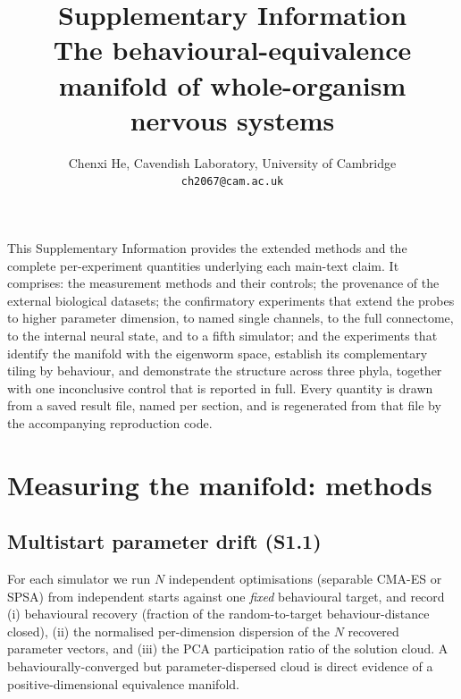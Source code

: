 \documentclass[11pt]{article}
\title{Supplementary Information \\ \large \textbf{The behavioural-equivalence manifold of whole-organism nervous systems}}
\author{Chenxi He, Cavendish Laboratory, University of Cambridge \\ \texttt{ch2067@cam.ac.uk}}
\date{}
\begin{document}
\maketitle
\tableofcontents

\noindent This Supplementary Information provides the extended methods and the complete per-experiment quantities underlying each main-text claim. It comprises: the measurement methods and their controls; the provenance of the external biological datasets; the confirmatory experiments that extend the probes to higher parameter dimension, to named single channels, to the full connectome, to the internal neural state, and to a fifth simulator; and the experiments that identify the manifold with the eigenworm space, establish its complementary tiling by behaviour, and demonstrate the structure across three phyla, together with one inconclusive control that is reported in full. Every quantity is drawn from a saved result file, named per section, and is regenerated from that file by the accompanying reproduction code.

\section{Measuring the manifold: methods}

\subsection{Multistart parameter drift (S1.1)}
For each simulator we run $N$ independent optimisations (separable CMA-ES or SPSA) from independent starts against one \emph{fixed} behavioural target, and record (i) behavioural recovery (fraction of the random-to-target behaviour-distance closed), (ii) the normalised per-dimension dispersion of the $N$ recovered parameter vectors, and (iii) the PCA participation ratio of the solution cloud. A behaviourally-converged but parameter-dispersed cloud is direct evidence of a positive-dimensional equivalence manifold.
\end{document}
